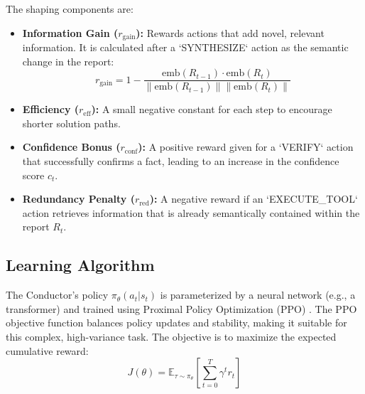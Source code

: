 \documentclass{article}
\begin{document}
The shaping components are:
\begin{itemize}
    \item \textbf{Information Gain ($r_{\text{gain}}$):} Rewards actions that add novel, relevant information. It is calculated after a `SYNTHESIZE` action as the semantic change in the report:
    \begin{equation}
        r_{\text{gain}} = 1 - \frac{\text{emb}(R_{t-1}) \cdot \text{emb}(R_t)}{\|\text{emb}(R_{t-1})\| \|\text{emb}(R_t)\|}
    \end{equation}
    \item \textbf{Efficiency ($r_{\text{eff}}$):} A small negative constant for each step to encourage shorter solution paths.
    \item \textbf{Confidence Bonus ($r_{\text{conf}}$):} A positive reward given for a `VERIFY` action that successfully confirms a fact, leading to an increase in the confidence score $c_t$.
    \item \textbf{Redundancy Penalty ($r_{\text{red}}$):} A negative reward if an `EXECUTE_TOOL` action retrieves information that is already semantically contained within the report $R_t$.
\end{itemize}

\subsection{Learning Algorithm}
The Conductor's policy $\pi_\theta(a_t | s_t)$ is parameterized by a neural network (e.g., a transformer) and trained using Proximal Policy Optimization (PPO) \cite{schulman2017proximal}. The PPO objective function balances policy updates and stability, making it suitable for this complex, high-variance task. The objective is to maximize the expected cumulative reward:
\begin{equation}
    J(\theta) = \mathbb{E}_{\tau \sim \pi_{\theta}} \left[ \sum_{t=0}^{T} \gamma^t r_t \right]
\end{equation}
\end{document}
